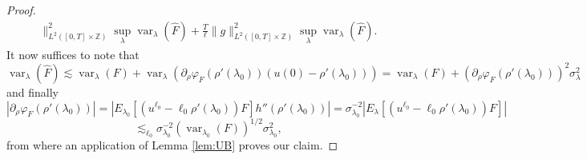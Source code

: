 \documentclass[11pt, a4paper]{article}
\newcommand{\mathd}{\mathrm{d}}
\newcommand{\tmop}[1]{\ensuremath{\operatorname{#1}}}
\newcommand{\1}{\mathbf{1}}
\begin{document}
\begin{proof}
{\begin{align*}
   \|_{L^2 ([0, T] \times \mathbb{Z})}^2 \sup_{\lambda}
   \tmop{var}_{\lambda} (\hat{F}) + \frac{T}{\ell} \| g \|_{L^2 ([0, T]
   \times \mathbb{Z})}^2 \sup_{\lambda} \tmop{var}_{\lambda} (\hat{F}).
  \end{align*}
  It now suffices to note that
  \[ \tmop{var}_{\lambda} (\hat{F}) \lesssim \tmop{var}_{\lambda} (F) +
     \tmop{var}_{\lambda} (\partial_{\rho} \varphi_F (\rho' (\lambda_0)) (u
     (0) - \rho' (\lambda_0))) = \tmop{var}_{\lambda} (F) + (\partial_{\rho}
     \varphi_F (\rho' (\lambda_0)))^2 \sigma_{\lambda}^2 \]
  and finally
  \[ | \partial_{\rho} \varphi_F (\rho' (\lambda_0)) | = | E_{\lambda_0}
     [(u^{\ell_0} - \ell_0 \rho' (\lambda_0)) F] h'' (\rho' (\lambda_0)) | =
     \sigma_{\lambda_0}^{- 2} | E_{\lambda} [(u^{\ell_0} - \ell_0 \rho'
     (\lambda_0)) F] | \]
  \[ \lesssim_{\ell_0} \sigma_{\lambda_0}^{- 2} (\tmop{var}_{\lambda_0}
     (F))^{1 / 2} \sigma_{\lambda_0}^2, \]
     from where an application of Lemma \ref{lem:UB} proves
  our claim.}
\end{proof}
\end{document}
